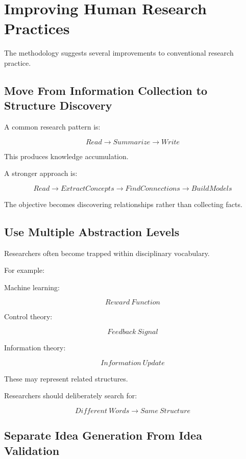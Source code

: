 \documentclass[11pt]{article}
\begin{document}
\section{Improving Human Research Practices}


The methodology suggests several improvements to conventional research
practice.



\subsection{Move From Information Collection to Structure Discovery}


A common research pattern is:


\[
Read
\rightarrow
Summarize
\rightarrow
Write
\]


This produces knowledge accumulation.


A stronger approach is:


\[
Read
\rightarrow
Extract Concepts
\rightarrow
Find Connections
\rightarrow
Build Models
\]


The objective becomes discovering relationships rather than collecting
facts.



\subsection{Use Multiple Abstraction Levels}


Researchers often become trapped within disciplinary vocabulary.


For example:


Machine learning:


\[
Reward\ Function
\]


Control theory:


\[
Feedback\ Signal
\]


Information theory:


\[
Information\ Update
\]


These may represent related structures.


Researchers should deliberately search for:


\[
Different\ Words
\rightarrow
Same\ Structure
\]



\subsection{Separate Idea Generation From Idea Validation}
\end{document}
